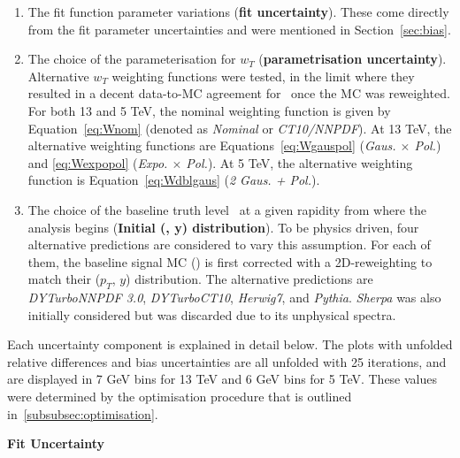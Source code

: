 \begin{enumerate}
  \item The fit function parameter variations (\textbf{fit uncertainty}). These come directly from the fit parameter uncertainties and were mentioned in Section~\ref{sec:bias}.
  \item The choice of the parameterisation for $w_{T}$ (\textbf{parametrisation uncertainty}). Alternative $w_{T}$ weighting functions were tested, in the limit where they resulted in a decent data-to-MC agreement for \ut\ once the MC was reweighted. For both 13 and 5 TeV, the nominal weighting function is given by Equation~\ref{eq:Wnom} (denoted as \textit{Nominal} or \textit{CT10/NNPDF}). At 13 TeV, the alternative weighting functions are Equations~\ref{eq:Wgauspol} (\textit{Gaus. $\times$ Pol.}) and \ref{eq:Wexpopol} (\textit{Expo. $\times$ Pol.}). At 5 TeV, the alternative weighting function is Equation~\ref{eq:Wdblgaus} (\textit{2 Gaus. + Pol.}).
  \item The choice of the baseline truth level \ptw\ at a given rapidity from where the analysis begins (\textbf{Initial (\ptw, y) distribution}). To be physics driven, four alternative predictions are considered to vary this assumption. For each of them, the baseline signal MC (\POWPYTHIA) is first corrected with a 2D-reweighting to match their ($p_{T}$, $y$) distribution. The alternative predictions are \textit{DYTurboNNPDF 3.0}, \textit{DYTurboCT10}, \textit{Herwig7}, and \textit{Pythia}. \textit{Sherpa} was also initially considered but was discarded due to its unphysical spectra.
\end{enumerate}
Each uncertainty component is explained in detail below. The plots with unfolded relative differences and bias uncertainties are all unfolded with 25 iterations, and are displayed in 7 GeV bins for 13 TeV and 6 GeV bins for 5 TeV. These values were determined by the optimisation procedure that is outlined in~\ref{subsubsec:optimisation}.

\textbf{Fit Uncertainty}

